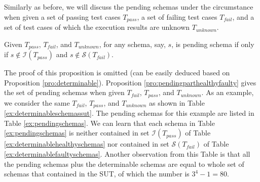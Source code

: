 Similarly as before, we will discuss the pending schemas under the circumstance when given a set of passing test cases $T_{pass}$, a set of failing test cases $T_{fail}$, and a set of test cases of which the execution results are unknown $T_{unknown}$.


\begin{proposition}\label{pro:pendingparthealthyfaulty}
Given $T_{pass}$, $T_{fail}$, and $T_{unknown}$, for any schema, say, $s$, is pending schema if only if $s \not\in \mathcal{I}(T_{pass})$ and   $s \not\in \mathcal{S}(T_{fail})$.
\end{proposition}

The proof of this proposition is omitted (can be easily deduced based on Proposition \ref{pro:determinable}). Proposition \ref{pro:pendingparthealthyfaulty} gives the set of pending schemas when given $T_{fail}$, $T_{pass}$, and $T_{unknown}$.
As an example, we consider the same  $T_{fail}$, $T_{pass}$, and $T_{unknown}$ as shown in Table \ref{ex:determinableschemassut}. The pending schemas for this example are listed in Table \ref{ex:pendingschemas}. We can learn that each schema in Table \ref{ex:pendingschemas} is neither contained in set $\mathcal{I}(T_{pass})$ of Table \ref{ex:determinablehealthyschemas} nor contained in set $\mathcal{S}(T_{fail})$ of Table \ref{ex:determinablefaultyschemas}. Another observation from this Table is that all the pending schemas plus the determinable schemas are equal to whole set of  schemas that contained in the SUT, of which the number is $3^{4} - 1 = 80$.

